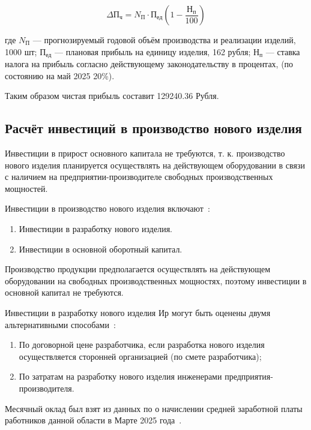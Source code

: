 \begin{equation}
  \Delta П_ч=N_П \cdot П_{ед} ( 1- \frac{Н_п}{100} )
\end{equation}

где $N_П$ — прогнозируемый годовой объём производства и реализации
изделий, 1000 шт; $П_{ед}$ — плановая прибыль на единицу изделия, 162 рубля;
$Н_п$ — ставка налога на прибыль согласно действующему законодательству в процентах,
(по состоянию на май 2025 20\%).

Таким образом чистая прибыль составит 129240.36 Рубля.


\subsection{Расчёт инвестиций в производство нового изделия}
Инвестиции в прирост основного капитала не требуются,
т. к. производство нового изделия планируется осуществлять на
действующем оборудовании в связи с наличием на
предприятии-производителе свободных производственных мощностей.

Инвестиции в производство нового изделия включают~\cite{bsuir-project-economics}:
\begin{enumerate}
\item Инвестиции в разработку нового изделия.
\item Инвестиции в основной оборотный капитал.
\end{enumerate}

Производство продукции предполагается осуществлять на действующем
оборудовании на свободных производственных мощностях, поэтому
инвестиции в основной капитал не требуются.


Инвестиции в разработку нового изделия $Ир$ могут быть оценены двумя
альтернативными способами~\cite{bsuir-project-economics}:
\begin{enumerate}
\item По договорной цене разработчика, если разработка нового изделия
  осуществляется сторонней организацией (по смете разработчика);
\item По затратам на разработку нового изделия инженерами
  предприятия-производителя.
\end{enumerate}



Месячный оклад был взят из данных по о начислении средней заработной
платы работников данной области в Марте 2025
года~\cite{belstat-salary}.



